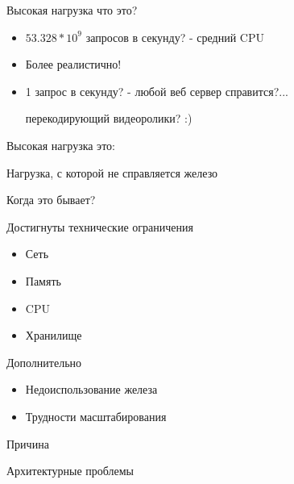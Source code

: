 \documentclass[aspectratio=169]{beamer}
\begin{document}
\begin{frame}{Высокая нагрузка что это?}
    \begin{itemize}

        \pause
        \item $53.328 * 10^9$  запросов в секунду?
            \pause
            {\small - средний CPU}

        \pause
        \item Более реалистично!

        \pause
        \item 1 запрос в секунду?
            \pause
            - любой веб сервер справится?...
            \pause
            \par {\small перекодирующий видеоролики? :)}
    \end{itemize}
\end{frame}

\begin{frame}{Высокая нагрузка это:}
    \pause
    \begin{center}
        {\huge Нагрузка, с которой не справляется железо}
    \end{center}
\end{frame}

\begin{frame}{Когда это бывает?}
    \begin{block}{Достигнуты технические ограничения}
        \begin{itemize}
            \item Сеть
            \item Память
            \item CPU
            \item Хранилище
        \end{itemize}
    \end{block}
    \begin{block}{Дополнительно}
        \begin{itemize}
            \item Недоиспользование железа
            \item Трудности масштабирования
        \end{itemize}
    \end{block}
\end{frame}

\begin{frame}{Причина}
    \begin{block}
        {\huge Архитектурные проблемы}
    \end{block}
\end{frame}
\end{document}
